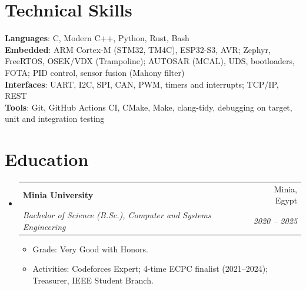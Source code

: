 \documentclass[letterpaper,11pt]{article}
\makeatletter
\newcommand{\resumeItem}[1]{
  \item\small{
    {#1 \vspace{-2pt}}
  }
}
\newcommand{\resumeSubheading}[4]{
  \vspace{-2pt}\item
    \begin{tabular*}{0.97\textwidth}[t]{l@{\extracolsep{\fill}}r}
      \textbf{#1} & #2 \\
      \textit{\small#3} & \textit{\small #4} \\
    \end{tabular*}\vspace{-7pt}
}
\newcommand{\resumeSubHeadingListStart}{\begin{itemize}[leftmargin=0.15in, label={}]}
\newcommand{\resumeSubHeadingListEnd}{\end{itemize}}
\newcommand{\resumeItemListStart}{\begin{itemize}}
\newcommand{\resumeItemListEnd}{\end{itemize}\vspace{-5pt}}
\makeatother
\begin{document}
%
\section{Technical Skills}
 \begin{itemize}[leftmargin=0.15in, label={}]
    \small{\item{
     \textbf{Languages}{: C, Modern C++, Python, Rust, Bash} \\
     \textbf{Embedded}{: ARM Cortex-M (STM32, TM4C), ESP32-S3, AVR; Zephyr, FreeRTOS, OSEK/VDX (Trampoline); AUTOSAR (MCAL), UDS, bootloaders, FOTA; PID control, sensor fusion (Mahony filter)} \\
     \textbf{Interfaces}{: UART, I2C, SPI, CAN, PWM, timers and interrupts; TCP/IP, REST} \\
     \textbf{Tools}{: Git, GitHub Actions CI, CMake, Make, clang-tidy, debugging on target, unit and integration testing}
    }}
 \end{itemize}

\section{Education}
  \resumeSubHeadingListStart
    \resumeSubheading
      {Minia University}{Minia, Egypt}
      {Bachelor of Science (B.Sc.), Computer and Systems Engineering}{2020 -- 2025}
      \resumeItemListStart
        \resumeItem{Grade: Very Good with Honors.}
        \resumeItem{Activities: Codeforces Expert; 4-time ECPC finalist (2021--2024); Treasurer, IEEE Student Branch.}
      \resumeItemListEnd
  \resumeSubHeadingListEnd


\end{document}
